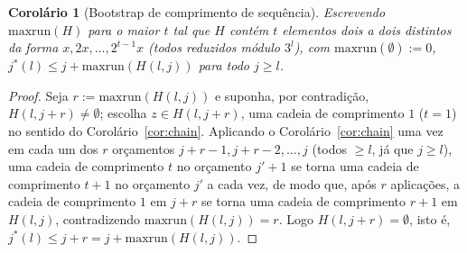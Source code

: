 \documentclass[11pt]{amsart}
\theoremstyle{plain}
\newtheorem{corollary}[theorem]{Corol\'ario}
\theoremstyle{definition}
\theoremstyle{remark}
\begin{document}
\begin{corollary}[Bootstrap de comprimento de sequência]
\label{cor:bootstrap}
Escrevendo $\mathrm{maxrun}(H)$ para o maior $t$ tal que $H$ contém $t$ elementos dois a dois
distintos da forma $x,2x,\dots,2^{t-1}x$ (todos reduzidos módulo $3^l$), com
$\mathrm{maxrun}(\emptyset):=0$, $j^*(l) \le j + \mathrm{maxrun}(H(l,j))$ para todo $j\ge l$.
\end{corollary}

\begin{proof}
Seja $r:=\mathrm{maxrun}(H(l,j))$ e suponha, por contradição, $H(l,j+r)\ne\emptyset$; escolha
$z\in H(l,j+r)$, uma cadeia de comprimento $1$ ($t=1$) no sentido do Corolário~\ref{cor:chain}.
Aplicando o Corolário~\ref{cor:chain} uma vez em cada um dos $r$ orçamentos
$j+r-1,j+r-2,\dots,j$ (todos $\ge l$, já que $j\ge l$), uma cadeia de comprimento $t$ no orçamento
$j'+1$ se torna uma cadeia de comprimento $t+1$ no orçamento $j'$ a cada vez, de modo que, após $r$
aplicações, a cadeia de comprimento $1$ em $j+r$ se torna uma cadeia de comprimento $r+1$ em
$H(l,j)$, contradizendo $\mathrm{maxrun}(H(l,j))=r$. Logo $H(l,j+r)=\emptyset$, isto é,
$j^*(l)\le j+r=j+\mathrm{maxrun}(H(l,j))$.
\end{proof}
\end{document}
